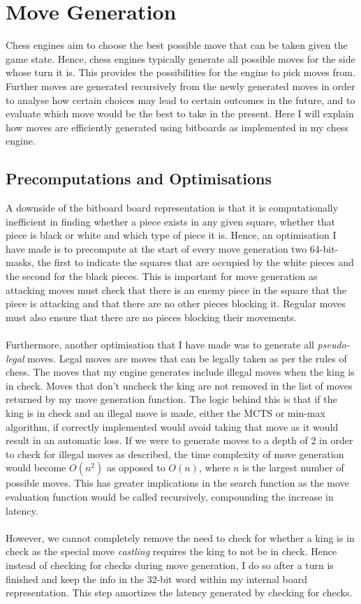 \chapter{Move Generation}
Chess engines aim to choose the best possible move that can be taken given the game state. Hence, chess engines typically generate all possible moves for the side whose turn it is. This provides the possibilities for the engine to pick moves from. Further moves are generated recursively from the newly generated moves in order to analyse how certain choices may lead to certain outcomes in the future, and to evaluate which move would be the best to take in the present. Here I will explain how moves are efficiently generated using bitboards as implemented in my chess engine.
\section{Precomputations and Optimisations}
A downside of the bitboard board representation is that it is computationally inefficient in finding whether a piece exists in any given square, whether that piece is black or white and which type of piece it is. Hence, an optimisation I have made is to precompute at the start of every move generation two 64-bit-masks, the first to indicate the squares that are occupied by the white pieces and the second for the black pieces. This is important for move generation as attacking moves must check that there is an enemy piece in the square that the piece is attacking and that there are no other pieces blocking it. Regular moves must also ensure that there are no pieces blocking their movements.\\\\
Furthermore, another optimisation that I have made was to generate all \textit{pseudo-legal} moves. Legal moves are moves that can be legally taken as per the rules of chess. The moves that my engine generates include illegal moves when the king is in check. Moves that don't uncheck the king are not removed in the list of moves returned by my move generation function. The logic behind this is that if the king is in check and an illegal move is made, either the MCTS or min-max algorithm, if correctly implemented would avoid taking that move as it would result in an automatic loss. If we were to generate moves to a depth of 2 in order to check for illegal moves as described, the time complexity of move generation would become $O(n^2)$ as opposed to $O(n)$, where $n$ is the largest number of possible moves. This has greater implications in the search function as the move evaluation function would be called recursively, compounding the increase in latency.\\\\
However, we cannot completely remove the need to check for whether a king is in check as the special move \textit{castling} requires the king to not be in check. Hence instead of checking for checks during move generation, I do so after a turn is finished and keep the info in the 32-bit word within my internal board representation. This step amortizes the latency generated by checking for checks.
